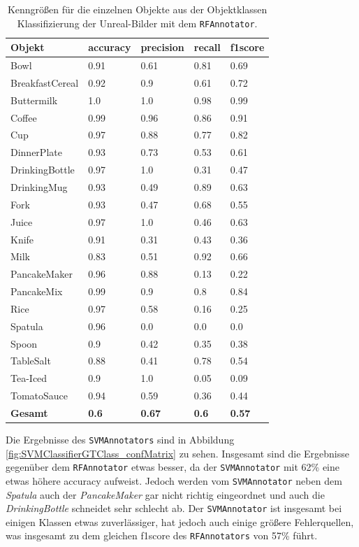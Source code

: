 \begin{table}
\centering
\small
{}
\begin{tabularx}{\textwidth}{Xllll}
\textbf{Objekt}	& \textbf{\gls{accuracy}} & \textbf{\gls{precision}}	& \textbf{\gls{recall}}	& \textbf{\gls{f1score}} \\ \hline
Bowl & 0.91 & 0.61 & 0.81 & 0.69 \\  
BreakfastCereal & 0.92 & 0.9 & 0.61 & 0.72 \\  
Buttermilk & 1.0 & 1.0 & 0.98 & 0.99 \\  
Coffee & 0.99 & 0.96 & 0.86 & 0.91 \\  
Cup & 0.97 & 0.88 & 0.77 & 0.82 \\  
DinnerPlate & 0.93 & 0.73 & 0.53 & 0.61 \\  
DrinkingBottle & 0.97 & 1.0 & 0.31 & 0.47 \\  
DrinkingMug & 0.93 & 0.49 & 0.89 & 0.63 \\  
Fork & 0.93 & 0.47 & 0.68 & 0.55 \\  
Juice & 0.97 & 1.0 & 0.46 & 0.63 \\  
Knife & 0.91 & 0.31 & 0.43 & 0.36 \\  
Milk & 0.83 & 0.51 & 0.92 & 0.66 \\  
PancakeMaker & 0.96 & 0.88 & 0.13 & 0.22 \\  
PancakeMix & 0.99 & 0.9 & 0.8 & 0.84 \\  
Rice & 0.97 & 0.58 & 0.16 & 0.25 \\  
Spatula & 0.96 & 0.0 & 0.0 & 0.0 \\  
Spoon & 0.9 & 0.42 & 0.35 & 0.38 \\  
TableSalt & 0.88 & 0.41 & 0.78 & 0.54 \\  
Tea-Iced & 0.9 & 1.0 & 0.05 & 0.09 \\  
TomatoSauce & 0.94 & 0.59 & 0.36 & 0.44 \\  \hline
\textbf{Gesamt}		&	\textbf{0.6}   &	\textbf{0.67}  & \textbf{0.6}     &  \textbf{0.57}     \\
\end{tabularx}
\caption[Objektklassen-spezifische Kenngrößen des RFAnnotators]{Kenngrößen für die einzelnen Objekte aus der Objektklassen Klassifizierung der Unreal-Bilder mit dem \texttt{RFAnnotator}.}
\label{tab:RFClassifierGTClass_metrics}
\end{table}

Die Ergebnisse des \texttt{SVMAnnotators} sind in Abbildung  \ref{fig:SVMClassifierGTClass_confMatrix} zu sehen. Insgesamt sind die Ergebnisse gegenüber dem \texttt{RFAnnotator} etwas besser, da der \texttt{SVMAnnotator} mit 62\% eine etwas höhere \gls{accuracy} aufweist. Jedoch werden vom \texttt{SVMAnnotator} neben dem \textit{Spatula} auch der \textit{PancakeMaker} gar nicht richtig eingeordnet und auch die \textit{DrinkingBottle} schneidet sehr schlecht ab. Der \texttt{SVMAnnotator} ist insgesamt bei einigen Klassen etwas zuverlässiger, hat jedoch auch einige größere Fehlerquellen, was insgesamt zu dem gleichen \gls{f1score} des \texttt{RFAnnotators} von 57\% führt.  

